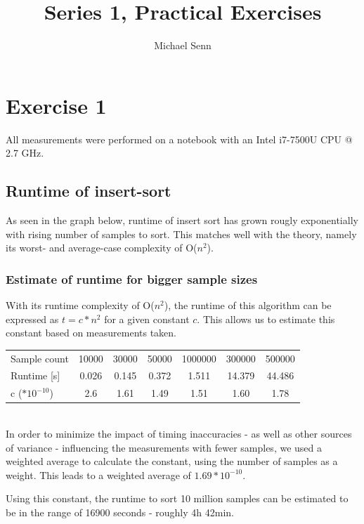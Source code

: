 \documentclass[a4paper]{scrartcl}
\title{Series 1, Practical Exercises}
\author{Michael Senn}
\date{}
\begin{document}
\maketitle


\section*{Exercise 1}

All measurements were performed on a notebook with an Intel i7-7500U CPU @ 2.7 GHz.

\subsection*{Runtime of insert-sort}

As seen in the graph below, runtime of insert sort has grown rougly
exponentially with rising number of samples to sort. This matches well with the
theory, namely its worst- and average-case complexity of O($n^2$).

\subsubsection*{Estimate of runtime for bigger sample sizes}

With its runtime complexity of O($n^2$), the runtime of this algorithm can be
expressed as $t = c * n^2$ for a given constant $c$. This allows us to estimate
this constant based on measurements taken.
\\

\begin{tabular}{|l|c|c|c|c|c|c|}
	\hline
	Sample count & 10000 & 30000 & 50000 & 1000000 & 300000 & 500000 \\
	Runtime [s] & 0.026 & 0.145 & 0.372 & 1.511 & 14.379 & 44.486 \\
	c ($ * 10^{-10}$)& 2.6 & 1.61 & 1.49 & 1.51 & 1.60 & 1.78 \\
	\hline
\end{tabular}
\\

In order to minimize the impact of timing inaccuracies - as well as other
sources of variance - influencing the measurements with fewer samples, we used
a weighted average to calculate the constant, using the number of samples as a
weight. This leads to a weighted average of $1.69 * 10^{-10}$.

Using this constant, the runtime to sort 10 million samples can be estimated to
be in the range of 16900 seconds - roughly 4h 42min.
\end{document}
